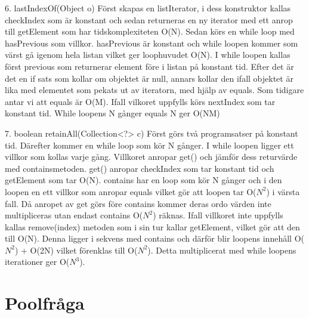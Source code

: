\documentclass[a4paper,10pt,oneside,onecolumn]{article}
\begin{document}
6. lastIndexOf(Object o)
Först skapas en listIterator, i dess konstruktor kallas checkIndex som är konstant och sedan returneras en ny iterator med ett anrop till getElement som har tidskomplexiteten O(N).
Sedan körs en while loop med hasPrevious som villkor. hasPrevious är konstant och while loopen kommer som värst gå igenom hela listan vilket ger loophuvudet O(N).
I while loopen kallas först previous som returnerar element före i listan på konstant tid.
Efter det är det en if sats som kollar om objektet är null, annars kollar den ifall objektet är lika med elementet som pekats ut av iteratorn, med hjälp av equals. Som tidigare antar vi att equals är O(M).
Ifall vilkoret uppfylls körs nextIndex som tar konstant tid.
While loopens N gånger equals N ger O(NM)

7.  boolean retainAll(Collection<?> c)
Först görs två programsatser på konstant tid.
Därefter kommer en while loop som kör N gånger.
I while loopen ligger ett villkor som kollas varje gång. Villkoret anropar get() och jämför dess returvärde med containsmetoden.
get() anropar checkIndex som tar konstant tid och getElement som tar O(N).
contains har en loop som kör N gånger och i den loopen en ett villkor som anropar equals vilket gör att loopen tar O($N^{2}$) i värsta fall.
Då anropet av get görs före contains kommer deras ordo värden inte multipliceras utan endast contains O($N^{2}$) räknas.
Ifall villkoret inte uppfylls kallas remove(index) metoden som i sin tur kallar getElement, vilket gör att den till O(N).
Denna ligger i sekvens med contains och därför blir loopens innehåll O($N^{2}$) + O(2N) vilket förenklas till O($N^{2}$).
Detta multiplicerat med while loopens iterationer ger O($N^{3}$).
\section{Poolfråga}

%


%
%
\end{document}
